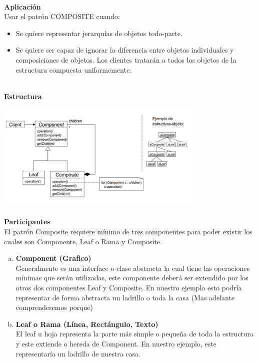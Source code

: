 \begin{flushleft}
\textbf{}\\
\textbf{Aplicación}\\


Usar el patrón COMPOSITE cuando:

\begin{itemize}
  \item Se quiere representar jerarquías de objetos todo-parte.
  \item Se quiere ser capaz de ignorar la diferencia entre objetos individuales y composiciones de objetos.  Los clientes tratarán a todos los objetos de la estructura compuesta uniformemente.

\end{itemize} 

\textbf{}\\
\textbf{Estructura}\\


\begin{center}
	\includegraphics[width=10cm]{./Imagenes/composite2} 
	\end{center}

\textbf{Participantes}\\

El patrón Composite requiere mínimo de tres componentes para poder existir los cuales son Componente, Leaf o Rama y Composite.

\begin{enumerate}[a)]
        \item \textbf{ Component (Grafico)}\\
Generalmente es una interface o clase abstracta la cual tiene las operaciones mínimas que serán utilizadas, este componente deberá ser extendido por los otros dos componentes Leaf y Composite. En nuestro ejemplo esto podría representar de forma abstracta un ladrillo o toda la casa (Mas adelante comprenderemos porque)

        \item \textbf{ Leaf o Rama (Línea, Rectángulo, Texto)}\\ 
El leaf u hoja representa la parte más simple o pequeña de toda la estructura y este extiende o hereda de Component. En nuestro ejemplo, este representaría un ladrillo de nuestra casa.


\end{enumerate}
\end{flushleft}
